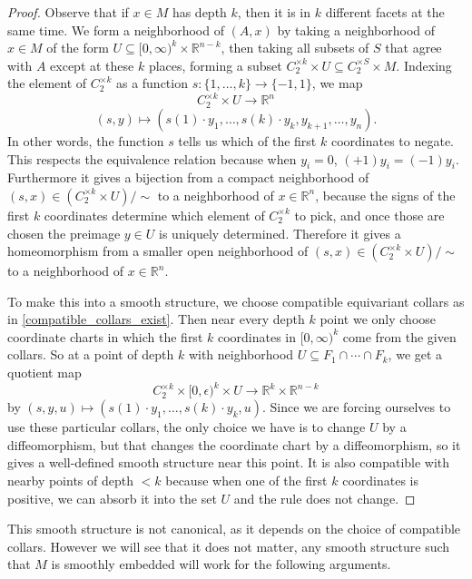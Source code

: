 \documentclass[11pt]{amsart}
\theoremstyle{definition}
\numberwithin{equation}{section}
\numberwithin{figure}{section}
\newcommand{\R}{\mathbb R}
\begin{document}
\begin{proof}
	Observe that if $x \in M$ has depth $k$, then it is in $k$ different facets at the same time. We form a neighborhood of $(A,x)$ by taking a neighborhood of $x \in M$ of the form $U \subseteq [0,\infty)^k \times \R^{n-k}$, then taking all subsets of $S$ that agree with $A$ except at these $k$ places, forming a subset $C_2^{\times k} \times U \subseteq C_2^{\times S} \times M$. Indexing the element of $C_2^{\times k}$ as a function $s\colon \{1,\ldots,k\} \to \{-1,1\}$, we map
	\[ C_2^{\times k} \times U \to \R^n \]
	\[ (s,y) \mapsto (s(1) \cdot y_1, \ldots, s(k) \cdot y_k, y_{k+1},\ldots, y_n). \]
	In other words, the function $s$ tells us which of the first $k$ coordinates to negate. This respects the equivalence relation because when $y_i = 0$, $(+1)y_i = (-1)y_i$. Furthermore it gives a bijection from a compact neighborhood of $(s,x) \in (C_2^{\times k} \times U)/{\sim}$ to a neighborhood of $x \in \R^n$, because the signs of the first $k$ coordinates determine which element of $C_2^{\times k}$ to pick, and once those are chosen the preimage $y \in U$ is uniquely determined. Therefore it gives a homeomorphism from a smaller open neighborhood of $(s,x) \in (C_2^{\times k} \times U)/{\sim}$ to a neighborhood of $x \in \R^n$.
	
	To make this into a smooth structure, we choose compatible equivariant collars as in \autoref{compatible_collars_exist}. Then near every depth $k$ point we only choose coordinate charts in which the first $k$ coordinates in $[0,\infty)^k$ come from the given collars. So at a point of depth $k$ with neighborhood $U \subseteq F_1 \cap \cdots \cap F_k$, we get a quotient map
	\[ C_2^{\times k} \times [0,\epsilon)^k \times U \to \R^k \times \R^{n-k} \]
	by $(s,y,u) \mapsto (s(1) \cdot y_1, \ldots, s(k) \cdot y_k, u)$. Since we are forcing ourselves to use these particular collars, the only choice we have is to change $U$ by a diffeomorphism, but that changes the coordinate chart by a diffeomorphism, so it gives a well-defined smooth structure near this point. It is also compatible with nearby points of depth $< k$ because when one of the first $k$ coordinates is positive, we can absorb it into the set $U$ and the rule does not change.
\end{proof}

This smooth structure is not canonical, as it depends on the choice of compatible collars. However we will see that it does not matter, any smooth structure such that $M$ is smoothly embedded will work for the following arguments.
\end{document}
